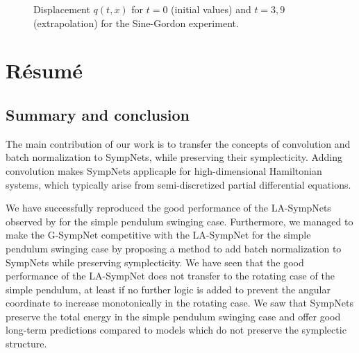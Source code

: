\documentclass[twoside,a4paper]{article}
\begin{document}
\begin{figure}
	\caption{Displacement $q(t,x)$ for $t=0$ (initial values) and $t=3,9$ (extrapolation) for the
	Sine-Gordon experiment.}\label{fig_sine_gordon_displacement}
\end{figure}

%
%
\clearpage\newpage\null %
\newpage
\section{R\'esum\'e}\label{sec_resume}
\subsection{Summary and conclusion}

The main contribution of our work is to transfer the concepts of
convolution and batch normalization to SympNets, while preserving their symplecticity.
Adding convolution makes SympNets applicaple for high-dimensional Hamiltonian systems,
which typically arise from semi-discretized partial differential equations. 

We have successfully reproduced the good performance of the LA-SympNets 
observed by \citeauthor{Jin2020} for the simple pendulum swinging case.
Furthermore, we managed to
make the G-SympNet competitive with the LA-SympNet for the simple pendulum swinging case
by proposing a method to add batch normalization to SympNets while preserving symplecticity.
We have seen that the good performance of the LA-SympNet does not
transfer to the rotating case of the simple pendulum, at least if no further logic
is added to prevent the angular coordinate to increase monotonically in the rotating case.
We saw that SympNets preserve the total energy in the simple pendulum swinging case and
offer good long-term predictions compared to models which do not preserve the symplectic
structure.
\end{document}
